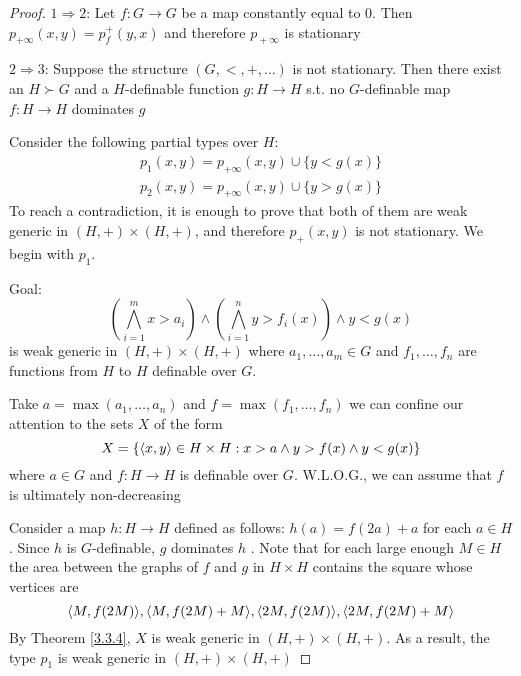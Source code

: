 \documentclass[11pt]{article}
\begin{document}
\begin{proof}
\(1\Rightarrow 2\): Let \(f:G\to G\) be a map constantly equal to 0. Then \(p_{+\infty}(x,y)=p_f^+(y,x)\) and
therefore \(p_{​+\infty}\) is stationary \label{Problem4}

\(2\Rightarrow 3\): Suppose the structure \((G,<,+,\dots)\) is not stationary. Then there exist an \(H\succ G\)
and a \(H\)-definable function \(g:H\to H\) s.t. no \(G\)-definable map \(f:H\to H\) dominates \(g\)

Consider the following partial types over \(H\):
\begin{gather*}
p_1(x,y)=p_{+\infty}(x,y)\cup\{y<g(x)\}\\
p_2(x,y)=p_{+\infty}(x,y)\cup\{y>g(x)\}
\end{gather*}
To reach a contradiction, it is enough to prove that both of them are weak generic
in \((H,+)\times(H,+)\), and therefore \(p_+(x,y)\) is not stationary. We begin with \(p_1\).

Goal:
\begin{equation*}
(\bigwedge_{i=1}^mx>a_i)\wedge(\bigwedge_{i=1}^ny>f_i(x))\wedge y<g(x)
\end{equation*}
is weak generic in \((H,+)\times(H,+)\) where \(a_1,\dots,a_m\in G\) and \(f_1,\dots,f_n\) are functions
from \(H\) to \(H\) definable over \(G\).

Take \(a=\max(a_1,\dots,a_n)\) and \(f=\max(f_1,\dots,f_n)\) we can confine our attention to the
sets \(X\) of the form
\begin{equation*}
X=\{\langle x,y\rangle\in H\times H:x>a\wedge y>f(x)\wedge y<g(x)\}
\end{equation*}
where \(a\in G\) and \(f:H\to H\) is definable over \(G\). W.L.O.G., we can assume that \(f\) is
ultimately non-decreasing

Consider a map \(h:H\to H\) defined as follows: \(h(a)=f(2a)+a\) for each \(a\in H\). Since \(h\)
is \(G\)-definable, \(g\) dominates \(h\) \label{Problem5}.
Note that for each large enough \(M\in H\) the area
between the graphs of \(f\) and \(g\) in \(H\times H\) contains the square whose vertices are
\begin{equation*}
\langle M,f(2M)\rangle,\langle M,f(2M)+M\rangle, \langle 2M,f(2M)\rangle, \langle 2M,f(2M)+M\rangle
\end{equation*}
By Theorem \ref{3.3.4}, \(X\) is weak generic in \((H,+)\times(H,+)\). As a result, the type \(p_1\) is
weak generic in \((H,+)\times(H,+)\)


\end{proof}
\end{document}
